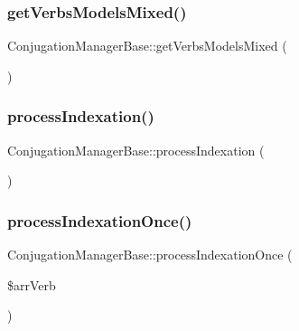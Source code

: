 \hypertarget{class_conjugation_manager_base_a87ceb2a9767830108d01928c19a90f83}{}\label{class_conjugation_manager_base_a87ceb2a9767830108d01928c19a90f83} 
\subsubsection{\texorpdfstring{get\+Verbs\+Models\+Mixed()}{getVerbsModelsMixed()}}
{\footnotesize\ttfamily Conjugation\+Manager\+Base\+::get\+Verbs\+Models\+Mixed (\begin{DoxyParamCaption}{ }\end{DoxyParamCaption})}

\hypertarget{class_conjugation_manager_base_aa8df6ff754ed94b8771aebff95e6e3fe}{}\label{class_conjugation_manager_base_aa8df6ff754ed94b8771aebff95e6e3fe} 
\subsubsection{\texorpdfstring{process\+Indexation()}{processIndexation()}}
{\footnotesize\ttfamily Conjugation\+Manager\+Base\+::process\+Indexation (\begin{DoxyParamCaption}{ }\end{DoxyParamCaption})}

\hypertarget{class_conjugation_manager_base_ad8091fd5ac8eb3c036de220ec6932234}{}\label{class_conjugation_manager_base_ad8091fd5ac8eb3c036de220ec6932234} 
\subsubsection{\texorpdfstring{process\+Indexation\+Once()}{processIndexationOnce()}}
{\footnotesize\ttfamily Conjugation\+Manager\+Base\+::process\+Indexation\+Once (\begin{DoxyParamCaption}\item[{}]{\$arr\+Verb }\end{DoxyParamCaption})}

